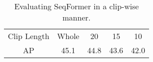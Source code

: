 \documentclass[runningheads]{llncs}
\begin{document}
\setlength{\tabcolsep}{4pt}
\begin{table}[h]
\begin{center}
\caption{Evaluating SeqFormer in a clip-wise manner. }
\label{clip_matching}
\begin{tabular}{ccccc}
\hline\noalign{\smallskip}
Clip Length   &Whole &20 &15 &10    \\
\noalign{\smallskip}
\midrule
AP  &45.1 &44.8  &43.6  &42.0\\
\hline
\end{tabular}
\end{center}
\end{table}
\setlength{\tabcolsep}{1.4pt}

 
\end{document}
